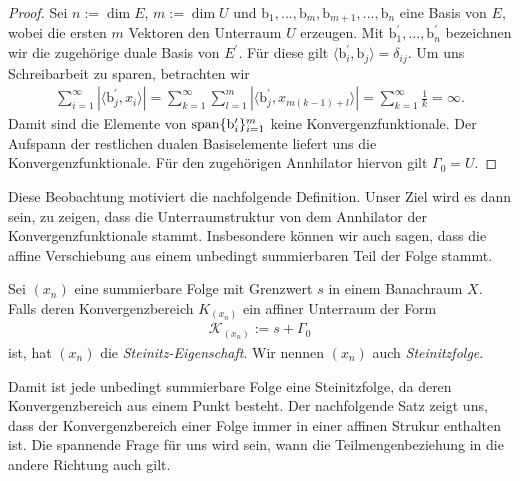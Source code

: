 \begin{proof}
	Sei $ n := \dim E $, $ m := \dim U $ und $ \mathrm{b}_1,...,\mathrm{b}_m, \mathrm{b}_{m+1},..., \mathrm{b}_n $ eine Basis von $ E $, wobei die ersten $ m $ Vektoren den Unterraum $ U $ erzeugen.
	Mit $ \mathrm{b}_1^\prime,..., \mathrm{b}_n^\prime $ bezeichnen wir die zugehörige duale Basis von $ E^\prime $.
	Für diese gilt $ \langle \mathrm{b}^\prime_i, \mathrm{b}_j \rangle = \delta_{ij}$. Um uns Schreibarbeit zu sparen, betrachten wir
	\begin{align*}
		\sum \limits_{i=1}^\infty |\langle \mathrm{b}_j^\prime,x_i
		\rangle|
		=
		\sum \limits_{k=1}^\infty
		\sum \limits_{ l = 1}^m
		|\langle\mathrm{b}_j^\prime,x_{m(k-1) + l} \rangle|
		=
		\sum \limits_{k=1}^\infty
		\frac{1}{k} = \infty.
	\end{align*} 
	Damit sind die Elemente von $ \mathrm{span} \{\mathrm{b}_i^\prime\}_{i = 1}^m $ keine Konvergenzfunktionale.
	Der Aufspann der restlichen dualen Basiselemente liefert uns die Konvergenzfunktionale.
	Für den zugehörigen Annhilator hiervon gilt $ \Gamma_0 = U $.
\end{proof}
Diese Beobachtung motiviert die nachfolgende Definition.
Unser Ziel wird es dann sein, zu zeigen, dass die Unterraumstruktur von dem Annhilator der Konvergenzfunktionale stammt.
Insbesondere können wir auch sagen, dass die affine Verschiebung aus einem unbedingt summierbaren Teil der Folge stammt.


\begin{df}
	Sei $ (x_n) $ eine summierbare Folge mit Grenzwert $ s $ in einem Banachraum $ X $.
	Falls deren Konvergenzbereich $ K_{(x_n)} $ ein affiner Unterraum der Form
	\begin{align*}
		\mathcal{K}_{(x_n)} := s + \Gamma_0
	\end{align*}
	ist, hat $ (x_n) $ die \textit{Steinitz-Eigenschaft}.
	Wir nennen $ (x_n) $ auch \textit{Steinitzfolge}.
\end{df}
Damit ist jede unbedingt summierbare Folge eine Steinitzfolge, da deren Konvergenzbereich aus einem Punkt besteht.
Der nachfolgende Satz zeigt uns, dass der Konvergenzbereich einer Folge immer in einer affinen Strukur enthalten ist.
Die spannende Frage für uns wird sein, wann die Teilmengenbeziehung in die andere Richtung auch gilt. 
 

